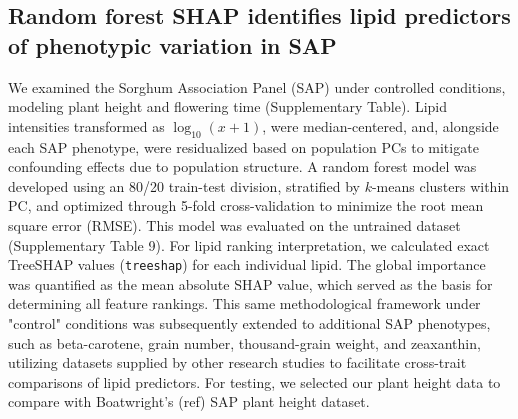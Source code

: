 \documentclass[10pt,letterpaper]{article}
\begin{document}





\subsection*{Random forest SHAP identifies lipid predictors of phenotypic variation in SAP}
We examined the Sorghum Association Panel (SAP) under controlled conditions, modeling plant height and flowering time (Supplementary Table). Lipid intensities transformed as $\log_{10}(x+1)$, were median-centered, and, alongside each SAP phenotype, were residualized based on population PCs to mitigate confounding effects due to population structure. A random forest model was developed using an 80/20 train-test division, stratified by $k$-means clusters within PC, and optimized through 5-fold cross-validation to minimize the root mean square error (RMSE). This model was evaluated on the untrained dataset (Supplementary Table 9). For lipid ranking interpretation, we calculated exact TreeSHAP values (\texttt{treeshap}) for each individual lipid. The global importance was quantified as the mean absolute SHAP value, which served as the basis for determining all feature rankings. This same methodological framework under "control" conditions was subsequently extended to additional SAP phenotypes, such as  beta-carotene, grain number, thousand-grain weight, and zeaxanthin, utilizing datasets supplied by other research studies to facilitate cross-trait comparisons of lipid predictors. For testing, we selected our plant height data to compare with Boatwright's (ref) SAP plant height dataset. 
\end{document}
